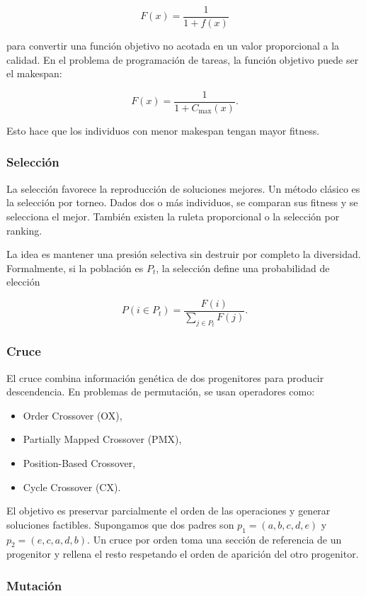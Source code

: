\documentclass[11pt,a4paper]{article}
\begin{document}
$$
F(x) = \frac{1}{1 + f(x)}
$$

para convertir una función objetivo no acotada en un valor proporcional a la calidad. En el problema de programación de tareas, la función objetivo puede ser el makespan:

$$
F(x) = \frac{1}{1 + C_{\max}(x)}.
$$

Esto hace que los individuos con menor makespan tengan mayor fitness.

\subsubsection{Selección}

La selección favorece la reproducción de soluciones mejores. Un método clásico es la selección por torneo. Dados dos o más individuos, se comparan sus fitness y se selecciona el mejor. También existen la ruleta proporcional o la selección por ranking.

La idea es mantener una presión selectiva sin destruir por completo la diversidad. Formalmente, si la población es $P_t$, la selección define una probabilidad de elección

$$
P(i \in P_t) = \frac{F(i)}{\sum_{j \in P_t} F(j)}.
$$

\subsubsection{Cruce}

El cruce combina información genética de dos progenitores para producir descendencia. En problemas de permutación, se usan operadores como:

\begin{itemize}
    \item Order Crossover (OX),
    \item Partially Mapped Crossover (PMX),
    \item Position-Based Crossover,
    \item Cycle Crossover (CX).
\end{itemize}

El objetivo es preservar parcialmente el orden de las operaciones y generar soluciones factibles. Supongamos que dos padres son $p_1 = (a,b,c,d,e)$ y $p_2 = (e,c,a,d,b)$. Un cruce por orden toma una sección de referencia de un progenitor y rellena el resto respetando el orden de aparición del otro progenitor.

\subsubsection{Mutación}
\end{document}
